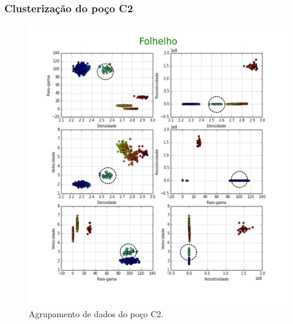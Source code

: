 \documentclass[10pt]{beamer} %
\begin{document}
\begin{frame}
	\frametitle{Clusterização do poço C2}
	\begin{figure}[H]
		\centering
		\includegraphics[scale=0.4]{Imagens/folhelhoC2.png}
		\caption{Agrupamento de dados do poço C2.}
	\end{figure} 
\end{frame}
\end{document}

